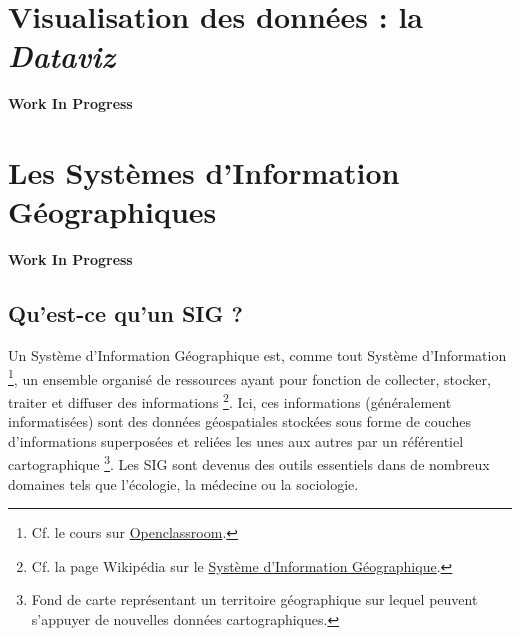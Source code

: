 \documentclass[
]{book}
\newenvironment{infobox}[1]
  {
  \begin{itemize}
  \renewcommand{\labelitemi}{
    \raisebox{-.7\height}[0pt][0pt]{
      {\setkeys{Gin}{width=3em,keepaspectratio}
        \texttt{[image: images/\#1]}}
    }
  }
  \setlength{\fboxsep}{1em}
  \begin{blackbox}
  \item
  }
  {
  \end{blackbox}
  \end{itemize}
  }
\begin{document}
\hypertarget{dataviz}{%
\chapter{\texorpdfstring{Visualisation des données : la \emph{Dataviz}}{Visualisation des données : la Dataviz}}\label{dataviz}}

\begin{infobox}{caution}

\textbf{Work In Progress}

\end{infobox}

\hypertarget{SIG}{%
\chapter{Les Systèmes d'Information Géographiques}\label{SIG}}

\begin{infobox}{caution}

\textbf{Work In Progress}

\end{infobox}

\hypertarget{quest-ce-quun-sig}{%
\section{Qu'est-ce qu'un SIG ?}\label{quest-ce-quun-sig}}

Un Système d'Information Géographique est, comme tout Système d'Information
\footnote{Cf. le cours sur
  \href{https://openclassrooms.com/fr/courses/2100086-decouvrez-le-monde-des-systemes-dinformation}{Openclassroom}.}, un ensemble organisé de ressources ayant pour fonction de collecter,
stocker, traiter et diffuser des informations \footnote{Cf. la page Wikipédia sur le
  \href{https://fr.wikipedia.org/wiki/Syst\%C3\%A8me_d\%27information_g\%C3\%A9ographique}{Système d'Information Géographique}.}. Ici, ces informations
(généralement informatisées) sont des données géospatiales stockées sous forme
de couches d'informations superposées et reliées les unes aux autres par un
référentiel cartographique \footnote{Fond de carte représentant un territoire géographique sur lequel
  peuvent s'appuyer de nouvelles données cartographiques.}. Les SIG sont devenus des outils
essentiels dans de nombreux domaines tels que l'écologie, la médecine ou la
sociologie.
\end{document}
